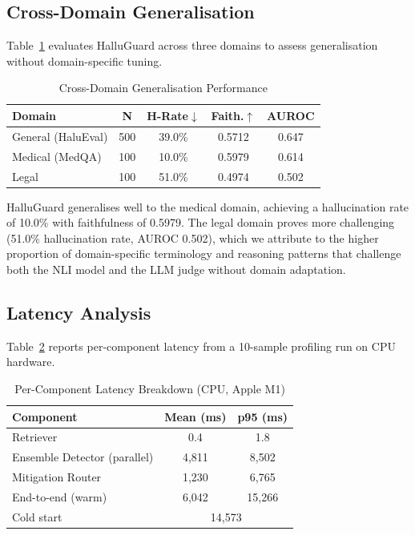 \documentclass[conference]{IEEEtran}
\begin{document}
\subsection{Cross-Domain Generalisation}

Table~\ref{tab:cross_domain} evaluates HalluGuard across three domains to assess generalisation without domain-specific tuning.

\begin{table}[t]
\centering
\caption{Cross-Domain Generalisation Performance}
\label{tab:cross_domain}
\begin{tabular}{@{}lcccc@{}}
\toprule
\textbf{Domain} & \textbf{N} & \textbf{H-Rate}$\downarrow$ & \textbf{Faith.}$\uparrow$ & \textbf{AUROC} \\
\midrule
General (HaluEval) & 500 & 39.0\% & 0.5712 & 0.647 \\
Medical (MedQA) & 100 & 10.0\% & 0.5979 & 0.614 \\
Legal & 100 & 51.0\% & 0.4974 & 0.502 \\
\bottomrule
\end{tabular}
\end{table}

HalluGuard generalises well to the medical domain, achieving a hallucination rate of 10.0\% with faithfulness of 0.5979. The legal domain proves more challenging (51.0\% hallucination rate, AUROC 0.502), which we attribute to the higher proportion of domain-specific terminology and reasoning patterns that challenge both the NLI model and the LLM judge without domain adaptation.

\subsection{Latency Analysis}

Table~\ref{tab:latency} reports per-component latency from a 10-sample profiling run on CPU hardware.

\begin{table}[t]
\centering
\caption{Per-Component Latency Breakdown (CPU, Apple M1)}
\label{tab:latency}
\begin{tabular}{@{}lcc@{}}
\toprule
\textbf{Component} & \textbf{Mean (ms)} & \textbf{p95 (ms)} \\
\midrule
Retriever & 0.4 & 1.8 \\
Ensemble Detector (parallel) & 4{,}811 & 8{,}502 \\
Mitigation Router & 1{,}230 & 6{,}765 \\
\midrule
End-to-end (warm) & 6{,}042 & 15{,}266 \\
Cold start & \multicolumn{2}{c}{14{,}573} \\
\bottomrule
\end{tabular}
\end{table}
\end{document}
